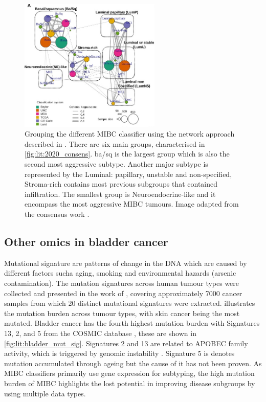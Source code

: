 \begin{figure}[!htb]    
    \centering
\includegraphics[width=0.6\textwidth,height=0.6\textheight,keepaspectratio]{Sections/Lit_review/Resources/consensus_network_classifier.jpg}
    \caption[Network of the datasets involved in the MIBC consensus subgroups]{Grouping the different MIBC classifier using the network approach described in \cite{Guinney2015-fy}. There are six main groups, characterised in \cref{fig:lit:2020_consens}. \acrfull{ba/sq} is the largest group which is also the second most aggressive subtype. Another major subtype is represented by the Luminal: papillary, unstable and non-specified, Stroma-rich contains most previous subgroups that contained infiltration. The smallest group is Neuroendocrine-like and it encompass the most aggressive MIBC tumours. Image adapted from the consensus work \citet{Kamoun2020-tj}.}
    \label{fig:lit:consensus_network}
\end{figure}




\subsection{Other omics in bladder cancer} \label{s:lit:bladder_other}

Mutational signature are patterns of change in the DNA which are caused by different factors sucha aging, smoking and environmental hazards (arsenic contamination). The mutation signatures across human tumour types were collected and presented in the work of \citeauthor{Alexandrov2013-gi}, covering approximately 7000 cancer samples from which 20 distinct mutational signatures were extracted.  illustrates the mutation burden across tumour types, with skin cancer being the most mutated. Bladder cancer has the fourth highest mutation burden with Signatures 13, 2, and 5 from the COSMIC database \citep{Tate2019-yj}, these are shown in \cref{fig:lit:bladder_mut_sig}. Signatures 2 and 13 are related to APOBEC family activity, which is triggered by genomic instability \citep{Baker2022-xw}. Signature 5 is denotes mutation accumulated through ageing but the cause of it has not been proven. As MIBC classifiers primarily use gene expression for subtyping, the high mutation burden of MIBC highlights the lost potential in improving disease subgroups by using multiple data types.

